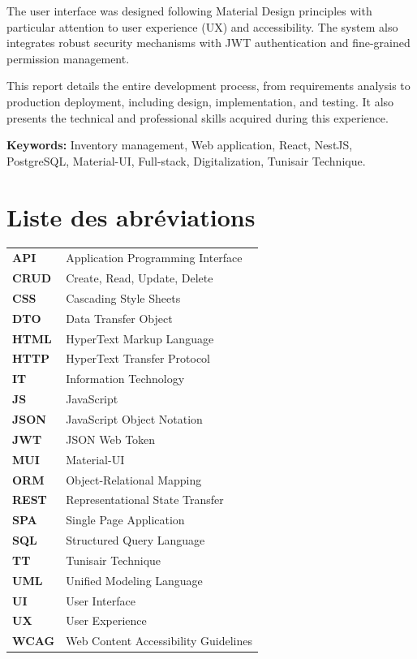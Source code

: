 \documentclass[12pt,a4paper]{report}
\begin{document}
The user interface was designed following Material Design principles with particular attention to user experience (UX) and accessibility. The system also integrates robust security mechanisms with JWT authentication and fine-grained permission management.

This report details the entire development process, from requirements analysis to production deployment, including design, implementation, and testing. It also presents the technical and professional skills acquired during this experience.

\textbf{Keywords:} Inventory management, Web application, React, NestJS, PostgreSQL, Material-UI, Full-stack, Digitalization, Tunisair Technique.

\newpage
\tableofcontents

\newpage
\listoffigures
{}

\newpage
\listoftables
{}

\newpage
\chapter*{Liste des abréviations}

\begin{tabularx}{\textwidth}{lX}
\textbf{API} & Application Programming Interface \\
\textbf{CRUD} & Create, Read, Update, Delete \\
\textbf{CSS} & Cascading Style Sheets \\
\textbf{DTO} & Data Transfer Object \\
\textbf{HTML} & HyperText Markup Language \\
\textbf{HTTP} & HyperText Transfer Protocol \\
\textbf{IT} & Information Technology \\
\textbf{JS} & JavaScript \\
\textbf{JSON} & JavaScript Object Notation \\
\textbf{JWT} & JSON Web Token \\
\textbf{MUI} & Material-UI \\
\textbf{ORM} & Object-Relational Mapping \\
\textbf{REST} & Representational State Transfer \\
\textbf{SPA} & Single Page Application \\
\textbf{SQL} & Structured Query Language \\
\textbf{TT} & Tunisair Technique \\
\textbf{UML} & Unified Modeling Language \\
\textbf{UI} & User Interface \\
\textbf{UX} & User Experience \\
\textbf{WCAG} & Web Content Accessibility Guidelines \\
\end{tabularx}
\end{document}
